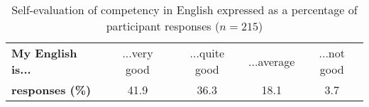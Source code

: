 \documentclass[output=paper,colorlinks,citecolor=brown]{langscibook}
\begin{document}
\begin{table}[!ht]
\centering
\begin{tabular}{lcccc}
    \toprule
    \textbf{My English is...} & ...very good & ...quite good & ...average & ...not good \\ \cmidrule{2-5}
    \textbf{responses (\%)} & 41.9 & 36.3 & 18.1 & 3.7 \\
    \bottomrule
\end{tabular}
\caption{Self-evaluation of competency in English expressed as a percentage of participant responses ($n=215$)}
\label{tab:tab5_07}
\end{table}

\begin{table}[!ht]
\centering
\setlength{\tabcolsep}{4pt}
\caption{Participant responses to the question “when you speak English, do you aim to speak with an accent?” expressed as a percentage ($n=215$)}
\label{tab:tab6_07}
\end{table}
\end{document}
